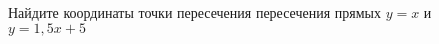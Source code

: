 \begin{ex}
	\begin{condition}
		Найдите координаты точки пересечения пересечения прямых $y=x$ и $y=1,5x+5$
	\end{condition}
\end{ex}